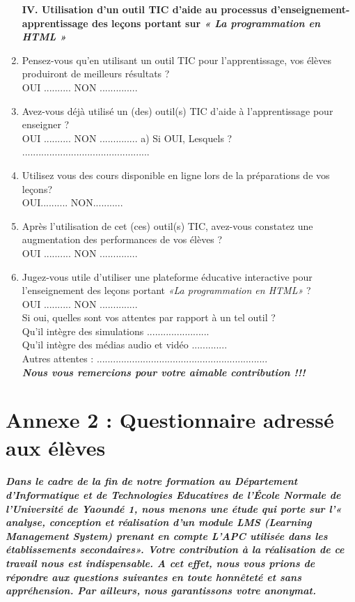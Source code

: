 \begin{enumerate}
\textbf{IV.	Utilisation d'un outil TIC d'aide au processus d'enseignement-apprentissage des leçons portant sur \emph{« La programmation en HTML »}}\\

\item Pensez-vous qu'en utilisant un outil TIC pour l'apprentissage, vos élèves produiront de meilleurs résultats ?\\	OUI .......... NON ..............	
\item Avez-vous déjà utilisé un (des) outil(s) TIC d'aide à l'apprentissage pour enseigner ?\\
OUI .......... NON ..............
a) Si OUI, Lesquels ? ...............................................

\item Utilisez vous des cours disponible en ligne lors de la préparations de vos leçons?\\
    OUI.......... NON...........
\item Après l'utilisation de cet (ces) outil(s) TIC, avez-vous constatez une augmentation des performances de vos élèves ?\\ 	
OUI .......... NON .............. 		
\item Jugez-vous utile d'utiliser une plateforme éducative interactive pour l'enseignement des leçons portant \emph{«La programmation en HTML»} ?\\ 		
OUI .......... NON ..............\\
Si oui, quelles sont vos attentes par rapport à un tel outil ?\\
Qu'il intègre des simulations .......................\\
Qu’il intègre des médias audio et vidéo .............\\
Autres attentes : ...............................................................\\

\emph{\textbf{Nous vous remercions pour votre aimable contribution !!!}}
\end{enumerate}

\newpage
\section*{Annexe 2 : Questionnaire adressé aux élèves}

\subparagraph{Dans le cadre de la fin de notre formation au Département d'Informatique et de Technologies Educatives de l'École Normale de l'Université de Yaoundé 1, nous menons une étude qui porte sur l'« analyse, conception et réalisation d'un module LMS (Learning Management System) prenant en compte L'APC utilisée dans les établissements secondaires». Votre contribution à la réalisation de ce travail nous est indispensable. A cet effet, nous vous prions de répondre aux questions suivantes en toute honnêteté et sans appréhension. Par ailleurs, nous garantissons votre anonymat.\\\\}

